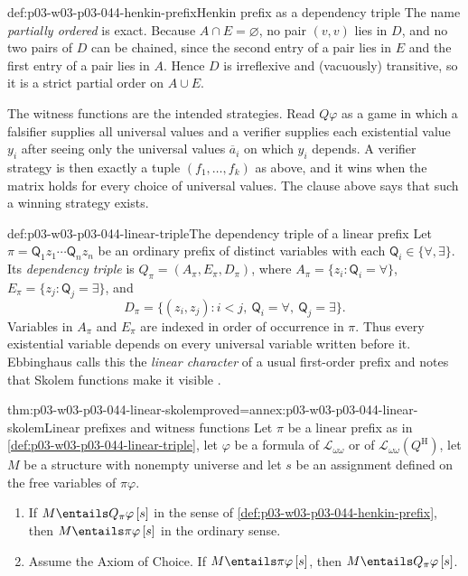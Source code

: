 \begin{hbdefinition}{def:p03-w03-p03-044-henkin-prefix}{Henkin prefix as a dependency triple}
The name \emph{partially ordered} is exact.  Because \(A\cap E=\varnothing\),
no pair \((v,v)\) lies in \(D\), and no two pairs of \(D\) can be chained,
since the second entry of a pair lies in \(E\) and the first entry of a pair
lies in \(A\).  Hence \(D\) is irreflexive and (vacuously) transitive, so it
is a strict partial order on \(A\cup E\).

The witness functions are the intended strategies.  Read \(Q\varphi\) as a
game in which a falsifier supplies all universal values and a verifier
supplies each existential value \(y_i\) after seeing only the universal
values \(\overline a_i\) on which \(y_i\) depends.  A verifier strategy is
then exactly a tuple \((f_1,\ldots,f_k)\) as above, and it wins when the
matrix holds for every choice of universal values.  The clause above says
that such a winning strategy exists.
\end{hbdefinition}

\begin{hbdefinition}{def:p03-w03-p03-044-linear-triple}{The dependency triple of a linear prefix}
Let \(\pi=\mathsf Q_1z_1\cdots\mathsf Q_nz_n\) be an ordinary prefix of
distinct variables with each \(\mathsf Q_i\in\{\forall,\exists\}\).  Its
\emph{dependency triple} is
\(Q_\pi=(A_\pi,E_\pi,D_\pi)\), where
\(A_\pi=\{z_i:\mathsf Q_i=\forall\}\), \(E_\pi=\{z_j:\mathsf Q_j=\exists\}\),
and
\[
 D_\pi=\{(z_i,z_j): i<j,\ \mathsf Q_i=\forall,\ \mathsf Q_j=\exists\}.
\]
Variables in \(A_\pi\) and \(E_\pi\) are indexed in order of occurrence in
\(\pi\).  Thus every existential variable depends on every universal variable
written before it.  Ebbinghaus calls this the \emph{linear character} of a
usual first-order prefix and notes that Skolem functions make it visible
\cite[p.~38]{Ebbinghaus1985ExtendedLogics}.
\end{hbdefinition}

\begin{hbtheorem}{thm:p03-w03-p03-044-linear-skolem}{proved=annex:p03-w03-p03-044-linear-skolem}{Linear prefixes and witness functions}
Let \(\pi\) be a linear prefix as in
\cref{def:p03-w03-p03-044-linear-triple}, let \(\varphi\) be a formula of
\(\mathscr L_{\omega\omega}\) or of \(\mathscr L_{\omega\omega}(Q^{\mathrm
H})\), let \(M\) be a structure with nonempty universe and let \(s\) be an
assignment defined on the free variables of \(\pi\varphi\).
\begin{enumerate}
 \item If \(M\entails Q_\pi\varphi\,[s]\) in the sense of
       \cref{def:p03-w03-p03-044-henkin-prefix}, then \(M\entails\pi\varphi\,[s]\)
       in the ordinary sense.
 \item Assume the Axiom of Choice.  If \(M\entails\pi\varphi\,[s]\), then
       \(M\entails Q_\pi\varphi\,[s]\).
\end{enumerate}
\end{hbtheorem}

